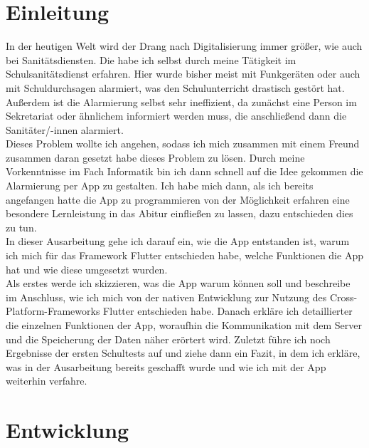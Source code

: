 \documentclass[12pt]{article}
\begin{document}
\newpage
\section{Einleitung}
\setcounter{page}{3}
    In der heutigen Welt wird der Drang nach Digitalisierung immer größer, wie auch bei Sanitätsdiensten.
    Die habe ich selbst durch meine Tätigkeit im Schulsanitätsdienst erfahren. Hier wurde bisher meist mit
    Funkgeräten oder auch mit Schuldurchsagen alarmiert, was den Schulunterricht drastisch gestört hat.
    Außerdem ist die Alarmierung selbst sehr ineffizient, da zunächst eine Person im Sekretariat oder ähnlichem 
    informiert werden muss, die anschließend dann die Sanitäter/-innen alarmiert.\\ 
    Dieses Problem wollte ich angehen, sodass ich mich zusammen mit einem Freund zusammen daran gesetzt habe dieses
    Problem zu lösen. Durch meine Vorkenntnisse im Fach Informatik bin ich dann schnell auf die Idee gekommen
    die Alarmierung per App zu gestalten. 
    Ich habe mich dann, als ich bereits angefangen hatte die App zu programmieren von der Möglichkeit erfahren
    eine besondere Lernleistung in das Abitur einfließen zu lassen, dazu entschieden dies zu tun.\\
    In dieser Ausarbeitung gehe ich darauf ein, wie die App entstanden ist, warum ich mich für das Framework Flutter
    entschieden habe, welche Funktionen die App hat und wie diese umgesetzt wurden.\\
    Als erstes werde ich skizzieren, was die App warum können soll und beschreibe im Anschluss, wie ich mich von der nativen 
    Entwicklung zur Nutzung des Cross-Platform-Frameworks Flutter entschieden habe.
    Danach erkläre ich detaillierter die einzelnen Funktionen der App, woraufhin die Kommunikation mit dem Server und die
    Speicherung der Daten näher erörtert wird. Zuletzt führe ich noch Ergebnisse der ersten Schultests auf und 
    ziehe dann ein Fazit, in dem ich erkläre, was in der Ausarbeitung bereits geschafft wurde und wie ich mit der App
    weiterhin verfahre.




\section{Entwicklung}





\end{document}
